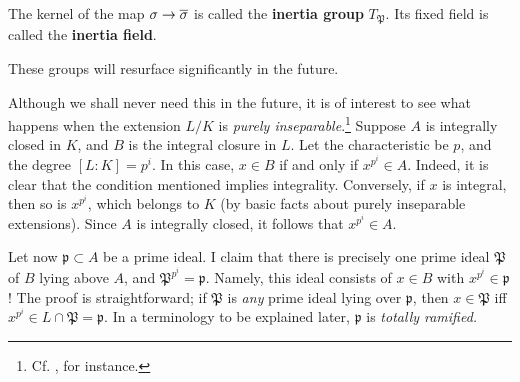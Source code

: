 \begin{definition} 
The kernel of the map $\sigma \to \overline{\sigma}$ is called the \textbf{inertia
group} $T_{\mathfrak{P}}$.  Its fixed field is called the \textbf{inertia
field}.
\end{definition}

These groups will resurface significantly in the future.

\begin{remark} Although we shall never need this in the future, it is of
interest to see what happens when the extension $L/K$ is \emph{purely
inseparable}.\footnote{Cf. \cite{La02}, for instance.}  Suppose $A$ is integrally closed in $K$, and $B$ is the integral closure in $L$.  Let the characteristic be $p$, and the degree $[L:K] = p^i$.
In this case, $x \in B$  if and only if $x^{p^i} \in A$. Indeed, it is clear that the condition mentioned implies integrality.  Conversely, if $x$ is integral, then so is $x^{p^i}$, which belongs to $K$ (by basic facts about purely inseparable extensions).  Since $A$ is integrally closed, it follows that $x^{p^i} \in A$.

Let now $\mathfrak{p} \subset A$ be a prime ideal.  I claim that there is precisely one prime ideal $\mathfrak{P}$ of $B$ lying above $A$, and $\mathfrak{P}^{p^i} = \mathfrak{p}$.  Namely, this ideal consists of $x \in B$ with $x^{p^i} \in \mathfrak{p}$!  The proof is straightforward; if $\mathfrak{P}$ is \emph{any} prime ideal lying over $\mathfrak{p}$, then $x \in \mathfrak{P}$ iff $x^{p^i} \in L \cap \mathfrak{P} = \mathfrak{p}$.   In a terminology to be explained later, $\mathfrak{p}$ is \emph{totally ramified.}
\end{remark}


